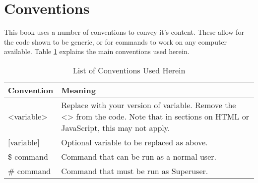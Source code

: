 \documentclass[twoside,a4paper,11pt]{report}
\begin{document}
	\section*{Conventions}
		This book uses a number of conventions to convey it's content.
		These allow for the code shown to be generic, or for commands to work on any computer available.
		Table \ref{tab:BookConventions} explains the main conventions used herein.
		\begin{table}[htb]
			\centering
			\begin{tabular}{l p{7cm}}
				\toprule
				\textbf{Convention} & \textbf{Meaning} \\
				\toprule
				<variable> & Replace with your version of variable.
								Remove the <> from the code.
								Note that in sections on HTML or JavaScript, this may not apply. \\ \vspace{0cm}
				[variable] & Optional variable to be replaced as above. \\
				\$ command & Command that can be run as a normal user. \\
				\# command & Command that must be run as Superuser. \\
				\bottomrule
			\end{tabular}
			\caption{List of Conventions Used Herein}
			\label{tab:BookConventions}
		\end{table}
\mainmatter















\appendix
	\label{ch:Appendix}
	
	
	\printindex
\end{document}
